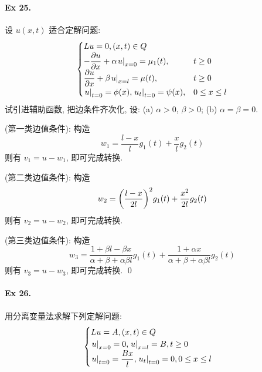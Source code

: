 \paragraph{Ex 25.}
设 $u(x, t)$ 适合定解问题:
\[ \begin{cases}
Lu = 0, (x, t) \in Q \\
-\dfrac{\partial u}{\partial x} + \alpha {\left.{u} \right|}_{x=0} = \mu_1(t), & t \geq 0 \\
\dfrac{\partial u}{\partial x} + \beta {\left.{u} \right|}_{x=l} = \mu(t), & t \geq 0 \\
{\left.{u} \right|}_{t=0} = \phi(x), {\left.{u_t} \right|}_{t=0} = \psi(x), & 0 \leq x \leq l
\end{cases} \]
试引进辅助函数, 把边条件齐次化, 设: (a) $\alpha > 0$, $\beta > 0$; (b)
$\alpha = \beta = 0$.

\begin{solution}
\noindent (第一类边值条件): 构造
\[w_1 = \frac{l-x}{l}g_1(t) + \frac xl g_2(t)\]
则有 $v_1 = u - w_1$, 即可完成转换.

\noindent (第二类边值条件): 构造
\[w_2 = {\left( {\frac{l-x}{2l}} \right)}^2 g_1(t) + \frac{x^2}{2l} g_2(t)\]
则有 $v_2 = u - w_2$, 即可完成转换.

\noindent (第三类边值条件): 构造
\[
w_3 = \frac{1 + \beta l- \beta x}{\alpha + \beta + \alpha\beta l} g_1(t)
+ \frac{1 + \alpha x}{\alpha + \beta + \alpha\beta l} g_2(t)
\]
则有 $v_3 = u - w_3$, 即可完成转换.
\qed
\end{solution}


\paragraph{Ex 26.}
用分离变量法求解下列定解问题:
\[ \begin{cases}
Lu = A, (x, t) \in Q \\
{\left.{u} \right|}_{x=0} = 0, {\left.{u} \right|}_{x=l} = B, t \geq 0 \\
{\left.{u} \right|}_{t=0} = \dfrac{Bx}{l}, {\left.{u_t} \right|}_{t=0} = 0, 0 \leq x \leq l
\end{cases} \]

